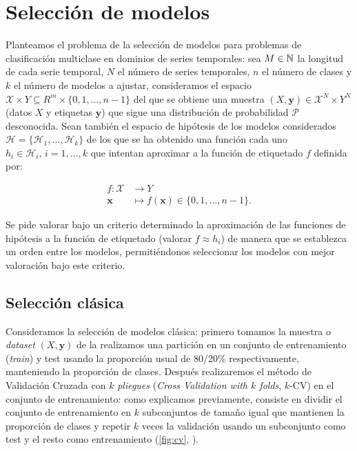 \chapter{Selección de modelos}\label{ch:pv}

Planteamos el problema de la selección de modelos para problemas de clasificación multiclase en dominios de series temporales: sea $M \in \mathbb{N}$ la longitud de cada serie temporal, $N$ el número de series temporales, $n$ el número de clases y $k$ el número de modelos a ajustar, consideramos el espacio $\mathcal{X} \times Y \subseteq R^m \times \{0, 1, \ldots, n - 1\} $ del que se obtiene una muestra $(X, \textbf{y}) \in \mathcal{X}^N \times Y^N$ (datos $X$ y etiquetas $\textbf{y}$) que sigue una distribución de probabilidad $\mathcal{P}$ desconocida. Sean también el espacio de hipótesis de los modelos considerados $\mathcal{H} = \{\mathcal{H}_1, \ldots, \mathcal{H}_k\}$ de los que se ha obtenido una función cada uno $h_i \in \mathcal{H}_i, \, i = 1, \ldots, k$ que intentan aproximar a la función de etiquetado $f$ definida por:

\begin{align*}
  f : \mathcal{X} & \to Y \\
  \textbf{x} & \mapsto f(\textbf{x}) \in \{0, 1, \ldots, n-1\}.
\end{align*}

Se pide valorar bajo un criterio determinado la aproximación de las funciones de hipótesis a la función de etiquetado (valorar $f \approx h_i$) de manera que se establezca un orden entre los modelos, permitiéndonos seleccionar los modelos con mejor valoración bajo este criterio.

\section{Selección clásica}

Consideramos la selección de modelos clásica: primero tomamos la muestra o \emph{dataset} $(X, \textbf{y})$ de la realizamos una partición en un conjunto de entrenamiento (\emph{train}) y test usando la proporción usual de 80/20\% respectivamente, manteniendo la proporción de clases. Después realizaremos el método de Validación Cruzada con $k$ \emph{pliegues} (\emph{Cross Validation with $k$ folds}, $k$-CV) \cite{stone1974cross} en el conjunto de entrenamiento: como explicamos previamente, consiste en dividir el conjunto de entrenamiento en $k$ subconjuntos de tamaño igual que mantienen la proporción de clases y repetir $k$ veces la validación usando un subconjunto como test y el resto como entrenamiento (\autoref{fig:cv}, \cite{niu2018rfamyloid}).

